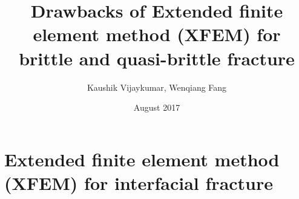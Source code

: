 \documentclass{article}
\title{Drawbacks of Extended finite element method (XFEM) for brittle and quasi-brittle fracture}
\author{Kaushik Vijaykumar, Wenqiang Fang}
\date{August 2017}
\begin{document}
\maketitle
\section{Extended finite element method (XFEM) for interfacial fracture}





\end{document}
